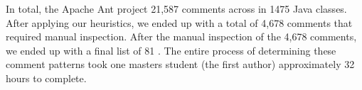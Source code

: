 In total, the Apache Ant project 21,587 comments across in 1475 Java classes. After applying our heuristics, we ended up with a total of 4,678 comments that required manual inspection. After the manual inspection of the 4,678 comments,  we ended up with a final list of 81 \SADTD.  The entire process of determining these \SADTD comment patterns took one masters student (the first author) approximately 32 hours to complete. 




